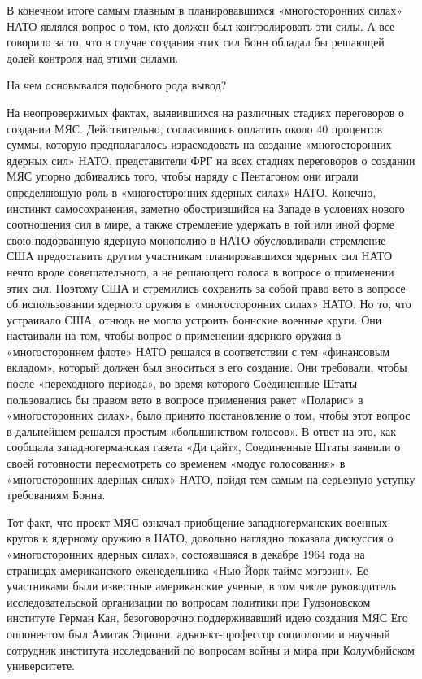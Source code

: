 \documentclass[12pt, a4paper, openany]{book}
\begin{document}
В конечном итоге самым главным в планировавшихся «многосторонних силах» НАТО являлся вопрос о том, кто должен был контролировать эти силы. А все говорило за то, что в случае создания этих сил Бонн обладал бы решающей долей контроля над этими силами.
	
На чем основывался подобного рода вывод?
	
На неопровержимых фактах, выявившихся на различных стадиях переговоров о создании МЯС. Действительно, согласившись оплатить около 40 процентов суммы, которую предполагалось израсходовать на создание «многосторонних ядерных сил» НАТО, представители ФРГ на всех стадиях переговоров о создании МЯС упорно добивались того, чтобы наряду с Пентагоном они играли определяющую роль в «многосторонних ядерных силах» НАТО. Конечно, инстинкт самосохранения, заметно обострившийся на Западе в условиях нового соотношения сил в мире, а также стремление удержать в той или иной форме свою подорванную ядерную монополию в НАТО обусловливали стремление США предоставить другим участникам планировавшихся ядерных сил НАТО нечто вроде совещательного, а не решающего голоса в вопросе о применении этих сил. Поэтому США и стремились сохранить за собой право вето в вопросе об использовании ядерного оружия в «многосторонних силах» НАТО. Но то, что устраивало США, отнюдь не могло устроить боннские военные круги. Они настаивали на том, чтобы вопрос о применении ядерного оружия в «многостороннем флоте» НАТО решался в соответствии с тем «финансовым вкладом», который должен был вноситься в его создание. Они требовали, чтобы после «переходного периода», во время которого Соединенные Штаты пользовались бы правом вето в вопросе применения ракет «Поларис» в «многосторонних силах», было принято постановление о том, чтобы этот вопрос в дальнейшем решался простым «большинством голосов». В ответ на это, как сообщала западногерманская газета «Ди цайт», Соединенные Штаты заявили о своей готовности пересмотреть со временем «модус голосования» в «многосторонних ядерных силах» НАТО, пойдя тем самым на серьезную уступку требованиям Бонна.
	
Тот факт, что проект МЯС означал приобщение западногерманских военных кругов к ядерному оружию в НАТО, довольно наглядно показала дискуссия о «многосторонних ядерных силах», состоявшаяся в декабре 1964 года на страницах американского еженедельника «Нью-Йорк таймс мэгэзин». Ее участниками были известные американские ученые, в том числе руководитель исследовательской организации по вопросам политики при Гудзоновском институте Герман Кан, безоговорочно поддерживавший идею создания МЯС Его оппонентом был Амитак Эциони, адъюнкт-профессор социологии и научный сотрудник института исследований по вопросам войны и мира при Колумбийском университете.
	
\end{document}
